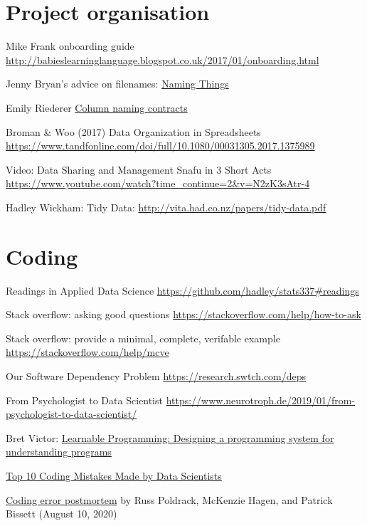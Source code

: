 \documentclass[
]{book}
\begin{document}
\hypertarget{project-organisation-1}{%
\section{Project organisation}\label{project-organisation-1}}

Mike Frank onboarding guide \url{http://babieslearninglanguage.blogspot.co.uk/2017/01/onboarding.html}

Jenny Bryan's advice on filenames: \href{http://www2.stat.duke.edu/~rcs46/lectures_2015/01-markdown-git/slides/naming-slides/naming-slides.pdf}{Naming Things}

Emily Riederer \href{https://emilyriederer.netlify.app/post/column-name-contracts/}{Column naming contracts}

Broman \& Woo (2017) Data Organization in Spreadsheets \url{https://www.tandfonline.com/doi/full/10.1080/00031305.2017.1375989}

Video: Data Sharing and Management Snafu in 3 Short Acts
\url{https://www.youtube.com/watch?time_continue=2\&v=N2zK3sAtr-4}

Hadley Wickham: Tidy Data: \url{http://vita.had.co.nz/papers/tidy-data.pdf}

\hypertarget{coding}{%
\section{Coding}\label{coding}}

Readings in Applied Data Science \url{https://github.com/hadley/stats337\#readings}

Stack overflow: asking good questions \url{https://stackoverflow.com/help/how-to-ask}

Stack overflow: provide a minimal, complete, verifable example \url{https://stackoverflow.com/help/mcve}

Our Software Dependency Problem \url{https://research.swtch.com/deps}

From Psychologist to Data Scientist \url{https://www.neurotroph.de/2019/01/from-psychologist-to-data-scientist/}

Bret Victor: \href{http://worrydream.com/LearnableProgramming/}{Learnable Programming: Designing a programming system for understanding programs}

\href{https://www.kdnuggets.com/2019/04/top-10-coding-mistakes-data-scientists.html}{Top 10 Coding Mistakes Made by Data Scientists}

\href{http://reproducibility.stanford.edu/coding-error-postmortem/}{Coding error postmortem} by Russ Poldrack, McKenzie Hagen, and Patrick Bissett (August 10, 2020)
\end{document}
